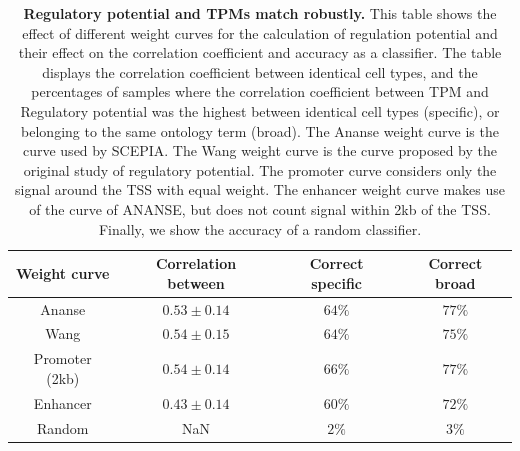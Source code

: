 \begin{table}[H]
    \centering
    \caption{\textbf{Regulatory potential and TPMs match robustly.} This table shows the effect of different weight curves for the calculation of regulation potential and their effect on the correlation coefficient and accuracy as a classifier. The table displays the correlation coefficient between identical cell types, and the percentages of samples where the correlation coefficient between TPM and Regulatory potential was the highest between identical cell types (specific), or belonging to the same ontology term (broad). The Ananse weight curve is the curve used by SCEPIA. The Wang weight curve is the curve proposed by the original study of regulatory potential. The promoter curve considers only the signal around the TSS with equal weight. The enhancer weight curve makes use of the curve of ANANSE, but does not count signal within 2kb of the TSS. Finally, we show the accuracy of a random classifier.}
    \begin{tabular}{||c c c c||} 
        \hline
        Weight curve & Correlation between & Correct specific & Correct broad \\[0.5ex] \hline
        Ananse\cite{Xu_2020}& $0.53 \pm 0.14$ & $64\%$ & $77\%$ \\ \hline
        Wang\cite{Wang2016} & $0.54 \pm 0.15 $ & $64\%$ & $75\%$ \\ \hline
        Promoter (2kb) & $0.54 \pm 0.14$ & $66\%$ & $77\%$ \\ \hline
        Enhancer & $0.43 \pm 0.14$ & $60\%$ & $72\%$ \\ \hline
        Random & NaN & $2\%$ & $3\%$ \\ \hline
    \end{tabular}
    \label{table:correlations}
\end{table}

\begin{table}[H]
    \centering
    \caption{\textbf{SCEPIA output for \textit{MEF2}-family factors}. Correlation table output of SCEPIA run on the whole hHCA dataset, selected for the absolute highest correlating motif for each of the \textit{MEF2} factors.}
    \label{tab:corrtable_SCEPIA}
\end{table}

